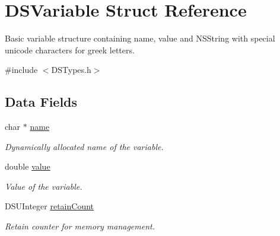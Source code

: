 \hypertarget{struct_d_s_variable}{
\section{DSVariable Struct Reference}
\label{struct_d_s_variable}
}


Basic variable structure containing name, value and NSString with special unicode characters for greek letters.  




{\ttfamily \#include $<$DSTypes.h$>$}

\subsection*{Data Fields}
\begin{DoxyCompactItemize}
\item 
\hypertarget{struct_d_s_variable_a5ac083a645d964373f022d03df4849c8}{
char $\ast$ \hyperlink{struct_d_s_variable_a5ac083a645d964373f022d03df4849c8}{name}}
\label{struct_d_s_variable_a5ac083a645d964373f022d03df4849c8}

\begin{DoxyCompactList}\small\item\em Dynamically allocated name of the variable. \item\end{DoxyCompactList}\item 
\hypertarget{struct_d_s_variable_aee90379adb0307effb138f4871edbc5c}{
double \hyperlink{struct_d_s_variable_aee90379adb0307effb138f4871edbc5c}{value}}
\label{struct_d_s_variable_aee90379adb0307effb138f4871edbc5c}

\begin{DoxyCompactList}\small\item\em Value of the variable. \item\end{DoxyCompactList}\item 
\hypertarget{struct_d_s_variable_ad5ce37afa302c9177c5543fb9cfaa191}{
DSUInteger \hyperlink{struct_d_s_variable_ad5ce37afa302c9177c5543fb9cfaa191}{retainCount}}
\label{struct_d_s_variable_ad5ce37afa302c9177c5543fb9cfaa191}

\begin{DoxyCompactList}\small\item\em Retain counter for memory management. \item\end{DoxyCompactList}\end{DoxyCompactItemize}


